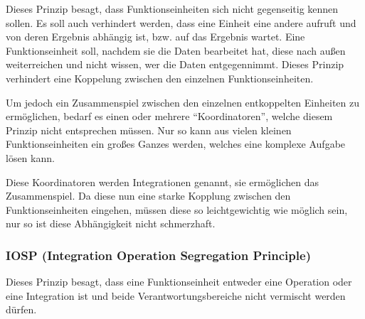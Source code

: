 Dieses Prinzip besagt, dass Funktionseinheiten sich nicht gegenseitig kennen sollen.
Es soll auch verhindert werden, dass eine Einheit eine andere aufruft und von deren Ergebnis
abhängig ist, bzw. auf das Ergebnis wartet.
Eine Funktionseinheit soll, nachdem sie die Daten bearbeitet hat, diese nach
außen weiterreichen und nicht wissen, wer die Daten entgegennimmt.
Dieses Prinzip verhindert eine Koppelung zwischen den einzelnen Funktionseinheiten.

Um jedoch ein Zusammenspiel zwischen den einzelnen entkoppelten Einheiten zu ermöglichen, bedarf es einen oder
mehrere \enquote{Koordinatoren}, welche diesem Prinzip nicht entsprechen müssen.
Nur so kann aus vielen kleinen Funktionseinheiten ein großes Ganzes werden, welches eine komplexe Aufgabe lösen kann.

Diese Koordinatoren werden Integrationen genannt, sie ermöglichen das Zusammenspiel. Da diese nun eine starke Kopplung zwischen den Funktionseinheiten eingehen, müssen diese so leichtgewichtig wie möglich sein, nur so ist diese Abhängigkeit nicht schmerzhaft.


\subsubsection{IOSP (Integration Operation Segregation Principle)}


Dieses Prinzip besagt, dass eine Funktionseinheit entweder eine Operation oder eine Integration ist und beide
Verantwortungsbereiche nicht vermischt werden dürfen.

